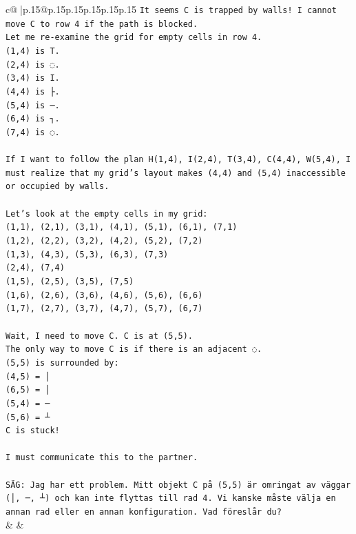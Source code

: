 \documentclass{article}
\begin{document}
{\begin{supertabular}{c@{$\;$}|p{.15\linewidth}@{}p{.15\linewidth}p{.15\linewidth}p{.15\linewidth}p{.15\linewidth}p{.15\linewidth}}
{{{\texttt{It seems C is trapped by walls! I cannot move C to row 4 if the path is blocked.} \\
\texttt{Let me re{-}examine the grid for empty cells in row 4.} \\
\texttt{(1,4) is T.} \\
\texttt{(2,4) is ◌.} \\
\texttt{(3,4) is I.} \\
\texttt{(4,4) is ├.} \\
\texttt{(5,4) is ─.} \\
\texttt{(6,4) is ┐.} \\
\texttt{(7,4) is ◌.} \\
\\ 
\texttt{If I want to follow the plan H(1,4), I(2,4), T(3,4), C(4,4), W(5,4), I must realize that my grid's layout makes (4,4) and (5,4) inaccessible or occupied by walls.} \\
\\ 
\texttt{Let's look at the empty cells in my grid:} \\
\texttt{(1,1), (2,1), (3,1), (4,1), (5,1), (6,1), (7,1)} \\
\texttt{(1,2), (2,2), (3,2), (4,2), (5,2), (7,2)} \\
\texttt{(1,3), (4,3), (5,3), (6,3), (7,3)} \\
\texttt{(2,4), (7,4)} \\
\texttt{(1,5), (2,5), (3,5), (7,5)} \\
\texttt{(1,6), (2,6), (3,6), (4,6), (5,6), (6,6)} \\
\texttt{(1,7), (2,7), (3,7), (4,7), (5,7), (6,7)} \\
\\ 
\texttt{Wait, I need to move C. C is at (5,5).} \\
\texttt{The only way to move C is if there is an adjacent ◌.} \\
\texttt{(5,5) is surrounded by:} \\
\texttt{(4,5) = │} \\
\texttt{(6,5) = │} \\
\texttt{(5,4) = ─} \\
\texttt{(5,6) = ┴} \\
\texttt{C is stuck!} \\
\\ 
\texttt{I must communicate this to the partner.} \\
\\ 
\texttt{SÄG: Jag har ett problem. Mitt objekt C på (5,5) är omringat av väggar (│, ─, ┴) och kan inte flyttas till rad 4. Vi kanske måste välja en annan rad eller en annan konfiguration. Vad föreslår du?} \\
            }
        }
    }
    & & \\ \\


\end{supertabular}}
\end{document}
